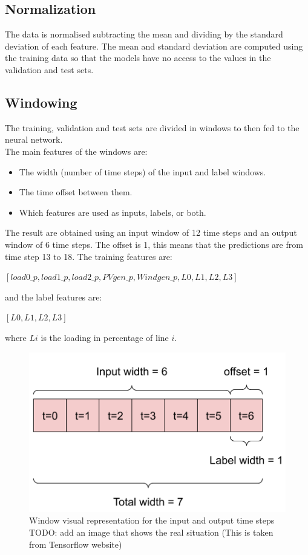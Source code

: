 \subsection{Normalization}
The data is normalised subtracting the mean and dividing by the standard deviation of each feature. The mean and standard deviation are computed using the training data so that the models have no access to the values in the validation and test sets.

\subsection{Windowing}
The training, validation and test sets are divided in windows to then fed to the neural network. \\
The main features of the windows are:
\begin{itemize}
    \item The width (number of time steps) of the input and label windows.
    \item The time offset between them.
    \item Which features are used as inputs, labels, or both.
\end{itemize}

The result are obtained using an input window of 12 time steps and an output window of 6 time steps. The offset is 1, this means that the predictions are from time step 13 to 18. The training features are:
\begin{algorithmic}
\State $[load0\_p, load1\_p, load2\_p, PVgen\_p, Wind gen\_p, L0, L1, L2, L3]$
\end{algorithmic}
and the label features are:
\begin{algorithmic}
\State $[L0, L1, L2, L3]$
\end{algorithmic}
where $Li$ is the loading in percentage of line $i$.

\begin{figure}[h]
    \centering
    \includegraphics[width=.7\linewidth]{images/GYM-ANM/DATASET PLOTS/raw_window_1h.png}
    \caption[GYM-ANM datasets windowing]{Window visual representation for the input and output time steps \\
    TODO: add an image that shows the real situation (This is taken from Tensorflow website)}
    \label{fig:net_sit3}
\end{figure}

